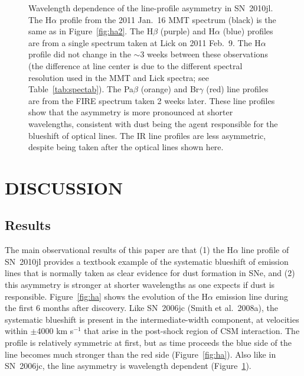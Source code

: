 \documentclass{emulateapj}
\begin{document}
\begin{figure}
\caption{Wavelength dependence of the line-profile asymmetry in
  SN~2010jl. The H$\alpha$ profile from the 2011 Jan.\ 16 MMT spectrum
  (black) is the same as in Figure~\ref{fig:ha2}.  The H$\beta$
  (purple) and H$\alpha$ (blue) profiles are from a single spectrum
  taken at Lick on 2011 Feb.\ 9.  The H$\alpha$ profile did not change
  in the $\sim$3 weeks between these observations (the difference at
  line center is due to the different spectral resolution used in the
  MMT and Lick spectra; see Table~\ref{tab:spectab}).  The Pa$\beta$
  (orange) and Br$\gamma$ (red) line profiles are from the FIRE
  spectrum taken 2 weeks later.  These line profiles show that the
  asymmetry is more pronounced at shorter wavelengths, consistent with
  dust being the agent responsible for the blueshift of optical
  lines. The IR line profiles are less asymmetric, despite being taken
  after the optical lines shown here.}
\label{fig:fire}
\end{figure}


\section{DISCUSSION}

\subsection{Results}

The main observational results of this paper are that (1) the H$\alpha$
line profile of SN~2010jl provides a textbook example of the
systematic blueshift of emission lines that is normally taken as clear
evidence for dust formation in SNe, and (2) this asymmetry is stronger
at shorter wavelengths as one expects if dust is responsible.
Figure~\ref{fig:ha} shows the evolution of the H$\alpha$ emission line
during the first 6 months after discovery. Like SN~2006jc (Smith et
al.\ 2008a), the systematic blueshift is present in the
intermediate-width component, at velocities within $\pm$4000 km
s$^{-1}$ that arise in the post-shock region of CSM interaction. The
profile is relatively symmetric at first, but as time proceeds the
blue side of the line becomes much stronger than the red side 
(Figure~\ref{fig:ha}). Also like in SN~2006jc, the line asymmetry is 
wavelength dependent (Figure~\ref{fig:fire}).
\end{document}
